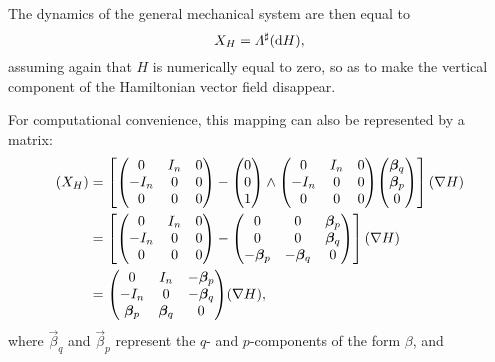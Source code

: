 The dynamics of the general mechanical system are then equal to 
\begin{equation} 
    X_H = \Lambda^\sharp(\dd{H}), 
    \label{eq:general_isomorphism}
\end{equation}
assuming again that $H$ is numerically equal to zero, so as to make the vertical component of the Hamiltonian vector field disappear. 

For computational convenience, this mapping can also be represented by a matrix: 
\begin{equation}
    \begin{split}
        (X_H) &= \qty[\mqty( 0 & I_n & 0 \\  -I_n & 0 & 0 \\ 0 & 0 & 0) 
                - \mqty(0 \\ 0 \\ 1) \wedge \mqty( 0 & I_n & 0 \\  -I_n & 0 & 0 \\ 0 & 0 & 0) \mqty(\vec{\beta}_{q} \\ \vec{\beta}_{p}\\0)](\nabla H) \\
              &= \qty[\mqty( 0 & I_n & 0 \\  -I_n & 0 & 0 \\ 0 & 0 & 0) 
                 - \mqty(0 & 0 & \vec{\beta}_p \\ 0 & 0 & \vec{\beta}_q \\ -\vec{\beta}_p &  -\vec{\beta}_q & 0 )](\nabla H) \\
              &= \mqty( 0 & I_n & -\vec{\beta}_p \\  -I_n & 0 & -\vec{\beta}_q \\ \vec{\beta}_p & \vec{\beta}_q & 0)(\nabla H),
    \end{split}
    \label{eq:matrix_jacobi_mapping}
\end{equation}
where $\vec{\beta}_q$ and $\vec{\beta}_p$ represent the $q$- and $p$-components of the form $\beta$, and 

